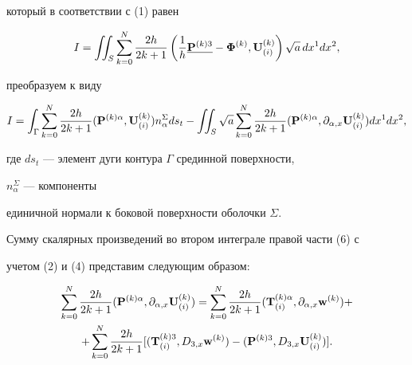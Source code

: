 который в соответствии с (1) равен 


\begin{equation} 


I=\iint_S\sum^N_{k=0}\frac{2h}{2k+1}\left(\frac{1}{h}


\underline{{\bold P}^{(k)3}}- 


{\boldsymbol \Phi}^{(k)}, {\bold U}^{(k)}_{(i)}\right)\sqrt a\,dx^1 dx^2, 


\end{equation} 


преобразуем к виду 


\begin{equation} 


I=\int_\Gamma\sum^N_{k=0}\frac{2h}{2k+1}({\bold P}^{(k)\alpha}, 


{\bold U}^{(k)}_{(i)})n^\Sigma_\alpha ds_t -


\iint_S\sqrt a\sum^N_{k=0}\frac{2h}{2k+1} 


({\bold P}^{(k)\alpha},\partial_{\alpha,x}{\bold U}^{(k)}_{(i)})


dx^1 dx^2, 


\end{equation} 


где $ds_t$ --- элемент дуги контура $\Gamma$ срединной поверхности, 


$n^\Sigma_\alpha$ --- компоненты 


единичной нормали к боковой поверхности оболочки $\Sigma$. 


 


Сумму скалярных произведений во втором интеграле правой части (6) с 


учетом (2) и (4) представим следующим образом: 


\begin{multline} 


\sum^N_{k=0}\frac{2h}{2k+1}


({\bold P}^{(k)\alpha},\partial_{\alpha,x}{\bold U}^{(k)}_{(i)})=


\sum^N_{k=0}\frac{2h}{2k+1}


({\bold T}^{(k)\alpha}_{(i)},\partial_{\alpha,x}{\bold w}^{(k)})+\\


+\sum^N_{k=0}\frac{2h}{2k+1}


[({\bold T}^{(k)3}_{(i)},D_{3,x}{\bold w}^{(k)})-


({\bold P}^{(k)3},D_{3,x}{\bold U}^{(k)}_{(i)})]. 


\end{multline} 


